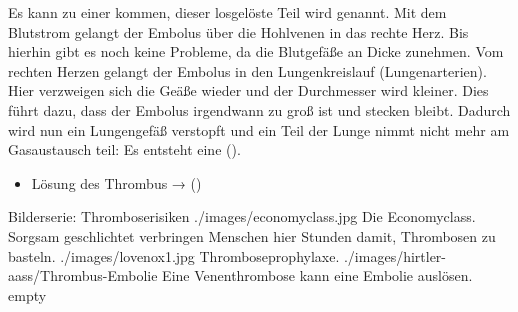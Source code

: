 {
Es kann zu einer 
kommen, dieser losgelöste Teil wird
 genannt. Mit dem Blutstrom
gelangt der Embolus über die Hohlvenen in das rechte Herz.
Bis hierhin gibt es noch keine Probleme, da die Blutgefäße
an Dicke zunehmen. Vom rechten Herzen gelangt der
Embolus in den Lungenkreislauf (Lungenarterien). Hier
verzweigen sich die Geäße wieder und der Durchmesser
wird kleiner. Dies führt dazu, dass der Embolus irgendwann
zu groß ist und stecken bleibt. Dadurch wird nun ein 
Lungengefäß verstopft und ein Teil der Lunge nimmt nicht
mehr am Gasaustausch teil: Es entsteht eine
().
}{
\begin{itemize}
  \item Lösung des Thrombus →
   ()
\end{itemize}
}{}{}{}




\begin{PictureSeriesWide}{}{Bilderserie: Thromboserisiken}
{./images/economyclass.jpg}
{Die Economyclass. Sorgsam geschlichtet verbringen Menschen
hier Stunden damit, Thrombosen zu basteln.
}
{./images/lovenox1.jpg}
{Throm\-bose\-prophy\-laxe. }
{./images/hirtler-aass/Thrombus-Embolie}
{Eine Venenthrombose kann eine Embolie auslösen. 
}
{empty}
{}
\end{PictureSeriesWide}




% 



